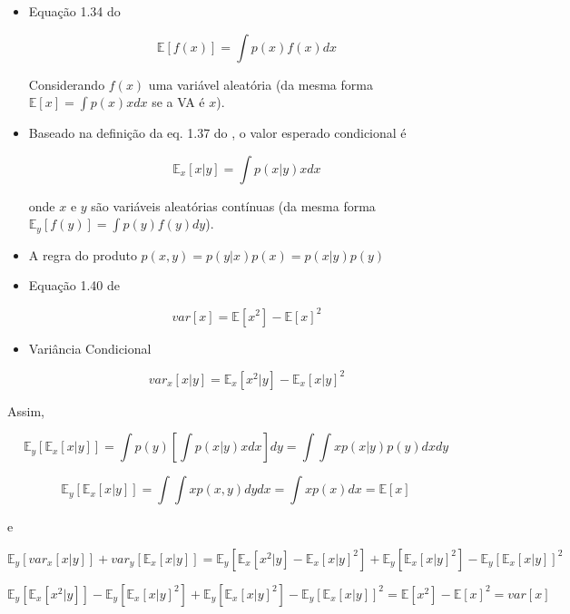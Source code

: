 \documentclass{article}
\begin{document}
 \begin{itemize}
 	\item Equação 1.34 do \cite{Bishop2006}
 	
 	  \begin{equation}
 	  	\mathbb{E}[f(x)] = \int p(x)f(x)dx
 	  \end{equation}
 	  
 	 Considerando $f(x)$ uma variável aleatória (da mesma forma $ \mathbb{E}[x]= \int p(x)x dx$ se a VA é $x$).
 	 
 	 \item Baseado na definição da eq. 1.37 do \cite{Bishop2006}, o valor esperado condicional é 
 	 
 	   \[
 	     \mathbb{E}_{x}[x|y]=\int p(x|y)xdx
 	   \]
 	   
 	   onde $x$ e $y$ são variáveis aleatórias contínuas (da mesma forma $\mathbb{E}_{y}[f(y)]= \int p(y) f(y)dy$).  
 	   
 	   
 	   \item  A regra do produto $p(x,y)=p(y|x)p(x)=p(x|y)p(y)$ 
 	   
 	   \item Equação 1.40 de \cite{Bishop2006}
 	   
 	     \[
 	      var[x] = \mathbb{E}[x^{2}]- \mathbb{E}[x]^{2}
 	     \]
 	     
 	   \item Variância Condicional
 	   
 	     \[
 	       var_{x}[x|y]=\mathbb{E}_{x}[x^{2}|y]-\mathbb{E}_{x}[x|y]^{2}
 	     \]  
 	
 \end{itemize}
 
 
  Assim,
  
  \[
   \mathbb{E}_{y}[\mathbb{E}_{x}[x|y]] = \int p(y) \left[\int p(x|y)xdx \right] dy = \int \int x p(x|y)p(y) dx dy 
  \]
 
  \[
  \mathbb{E}_{y}[\mathbb{E}_{x}[x|y]] = \int \int x p(x,y) dy dx = \int x p(x) dx = \mathbb{E}[x]
  \]
 
 e
 
  \[
    \mathbb{E}_{y}[var_{x}[x|y]]+var_{y}[\mathbb{E}_{x}[x|y]]= \mathbb{E}_{y}[\mathbb{E}_{x}[x^{2}|y]-\mathbb{E}_{x}[x|y]^{2}]+ \mathbb{E}_{y}[\mathbb{E}_{x}[x|y]^{2}]-\mathbb{E}_{y}[\mathbb{E}_{x}[x|y]]^{2}
  \]   
  
  \[
   \mathbb{E}_{y}[\mathbb{E}_{x}[x^{2}|y]] -\mathbb{E}_{y}[\mathbb{E}_{x}[x|y]^{2}]+\mathbb{E}_{y}[\mathbb{E}_{x}[x|y]^{2}]-\mathbb{E}_{y}[\mathbb{E}_{x}[x|y]]^{2} = \mathbb{E}[x^{2}]- \mathbb{E}[x]^{2}=var[x]
  \]
\end{document}
